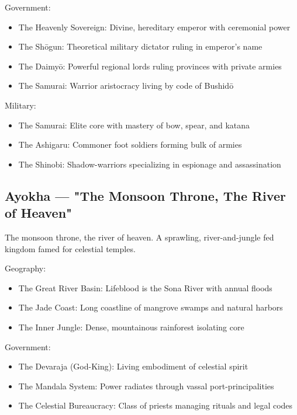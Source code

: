Government:
\begin{itemize}
    \item The Heavenly Sovereign: Divine, hereditary emperor with ceremonial power
    \item The Shōgun: Theoretical military dictator ruling in emperor's name
    \item The Daimyō: Powerful regional lords ruling provinces with private armies
    \item The Samurai: Warrior aristocracy living by code of Bushidō
\end{itemize}

Military:
\begin{itemize}
    \item The Samurai: Elite core with mastery of bow, spear, and katana
    \item The Ashigaru: Commoner foot soldiers forming bulk of armies
    \item The Shinobi: Shadow-warriors specializing in espionage and assassination
\end{itemize}

\subsection{Ayokha — "The Monsoon Throne, The River of Heaven"}
\label{sec:ayokha}

The monsoon throne, the river of heaven. A sprawling, river-and-jungle fed kingdom famed for celestial temples.

Geography:
\begin{itemize}
    \item The Great River Basin: Lifeblood is the Sona River with annual floods
    \item The Jade Coast: Long coastline of mangrove swamps and natural harbors
    \item The Inner Jungle: Dense, mountainous rainforest isolating core
\end{itemize}

Government:
\begin{itemize}
    \item The Devaraja (God-King): Living embodiment of celestial spirit
    \item The Mandala System: Power radiates through vassal port-principalities
    \item The Celestial Bureaucracy: Class of priests managing rituals and legal codes
\end{itemize}

